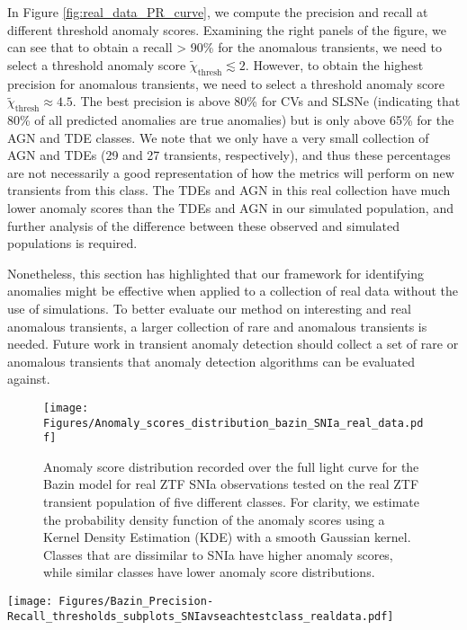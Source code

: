 \documentclass[fleqn,usenatbib]{mnras}
\begin{document}
In Figure \ref{fig:real_data_PR_curve}, we compute the precision and recall at different threshold anomaly scores. Examining the right panels of the figure, we can see that to obtain a recall > 90\% for the anomalous transients, we need to select a threshold anomaly score $\tilde{\chi}_{\mathrm{thresh}} \lesssim 2$. However, to obtain the highest precision for anomalous transients, we need to select a threshold anomaly score $\tilde{\chi}_{\mathrm{thresh}} \approx 4.5$. The best precision is above 80\% for CVs and SLSNe (indicating that 80\% of all predicted anomalies are true anomalies) but is only above 65\% for the AGN and TDE classes. We note that we only have a very small collection of AGN and TDEs (29 and 27 transients, respectively), and thus these percentages are not necessarily a good representation of how the metrics will perform on new transients from this class. The TDEs and AGN in this real collection have much lower anomaly scores than the TDEs and AGN in our simulated population, and further analysis of the difference between these observed and simulated populations is required.

Nonetheless, this section has highlighted that our framework for identifying anomalies might be effective when applied to a collection of real data without the use of simulations. To better evaluate our method on interesting and real anomalous transients, a larger collection of rare and anomalous transients is needed. Future work in transient anomaly detection should collect a set of rare or anomalous transients that anomaly detection algorithms can be evaluated against.


\begin{figure}
    \centering
    \texttt{[image: Figures/Anomaly\_scores\_distribution\_bazin\_SNIa\_real\_data.pdf]}
    \caption{Anomaly score distribution recorded over the full light curve for the Bazin model for real ZTF SNIa observations tested on the real ZTF transient population of five different classes. For clarity, we estimate the probability density function of the anomaly scores using a Kernel Density Estimation (KDE) with a smooth Gaussian kernel. Classes that are dissimilar to SNIa have higher anomaly scores, while similar classes have lower anomaly score distributions.}
    \label{fig:real_data_Anomaly_score_distribution}
\end{figure}

\begin{figure*}
    \centering
    \texttt{[image: Figures/Bazin\_Precision-Recall\_thresholds\_subplots\_SNIavseachtestclass\_realdata.pdf]}
    \caption{Precision-recall curve based on a Bazin model for real ZTF SNIa observations where we assume the SNIa class as the reference class and the anomalous classes are the ones denoted in the legend. We test the performance of this model on real observations of AGN, SLSN, CV, and TDE classes. We use the anomaly scores over the full light curves of all transients in the real data testing set to make the precision-recall curves.}
    \label{fig:real_data_PR_curve}
\end{figure*}
\end{document}
